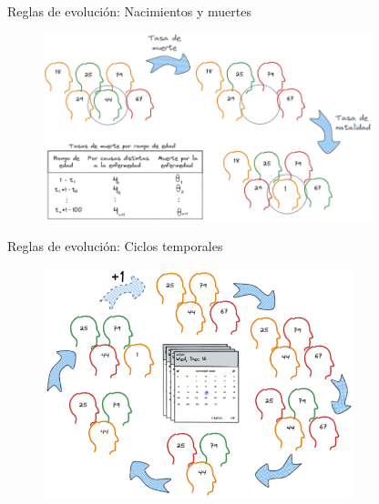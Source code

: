 \documentclass[9pt]{beamer}
\begin{document}
\begin{frame}{Reglas de evolución: Nacimientos y muertes}
\begin{figure}[h]
  \centering
    \includegraphics[width=0.85\textwidth]{Imagenes/tasasLetalidad.png}
\end{figure}
\end{frame}

\begin{frame}{Reglas de evolución: Ciclos temporales}
\begin{figure}[h]
  \centering
    \includegraphics[width=0.8\textwidth]{Imagenes/cicloAnual.png}
\end{figure}
\end{frame}
\end{document}
